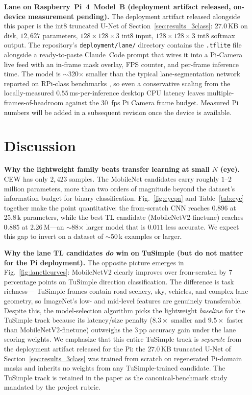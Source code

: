 \documentclass[conference]{IEEEtran}
\begin{document}
\textbf{Lane on Raspberry~Pi~4~Model~B (deployment artifact released,
on-device measurement pending).}
The deployment artifact released alongside this paper is the int8
truncated U-Net of Section~\ref{sec:results_3class}: $27.0$\,KB on
disk, $12{,}627$ parameters, $128\!\times\!128\!\times\!3$ int8
input, $128\!\times\!128\!\times\!3$ int8 softmax output. The
repository's \texttt{deployment/lane/} directory contains the
\texttt{.tflite} file alongside a ready-to-paste Claude~Code prompt
that wires it into a Pi-Camera live feed with an in-frame
mask overlay, FPS counter, and per-frame inference time. The model
is $\sim$320$\times$ smaller than the typical lane-segmentation
network reported on RPi-class benchmarks
\cite{deepedge,hackster_rpi5}, so even a conservative scaling
from the locally-measured $0.55$\,ms-per-inference desktop CPU
latency leaves multiple-frames-of-headroom against the 30~fps
Pi Camera frame budget. Measured Pi numbers will be added in a
subsequent revision once the device is available.

\section{Discussion}\label{sec:discussion}

\textbf{Why the lightweight family beats transfer learning at small $N$
(eye).}
CEW has only $2{,}423$ samples. The MobileNet candidates carry roughly
$1$--$2$ million parameters, more than two orders of magnitude beyond
the dataset's information budget for binary classification.
Fig.~\ref{fig:eyepa} and Table~\ref{tab:eye} together make the point
quantitative: the from-scratch CNN reaches $0.896$ at 25.8\,k
parameters, while the best TL candidate
(MobileNetV2-finetune) reaches $0.885$ at 2.26\,M---an $\sim$88$\times$
larger model that is $0.011$ less accurate. We expect this gap to
invert on a dataset of $\sim$50\,k examples or larger.

\textbf{Why the lane TL candidates \emph{do} win on TuSimple (but
do not matter for the Pi deployment).}
The opposite picture emerges in Fig.~\ref{fig:lanetlcurves}: MobileNetV2
clearly improves over from-scratch by 7\,percentage points on
TuSimple direction classification. The difference is task richness---
TuSimple frames contain road scenery, sky, vehicles, and complex lane
geometry, so ImageNet's low- and mid-level features are genuinely
transferable. Despite this, the model-selection algorithm picks the
lightweight \textit{baseline} for the TuSimple track because its
latency/size penalty ($8.3\times$ smaller and $9.5\times$ faster than
MobileNetV2-finetune) outweighs the $3$\,pp accuracy gain under the
lane scoring weights. We emphasize that this entire TuSimple track is
\emph{separate} from the deployment artifact released for the Pi: the
$27.0$\,KB truncated U-Net of Section~\ref{sec:results_3class} was
trained from scratch on regenerated Pi-domain masks and inherits no
weights from any TuSimple-trained candidate. The TuSimple track is
retained in the paper as the canonical-benchmark study mandated by
the project rubric.
\end{document}
